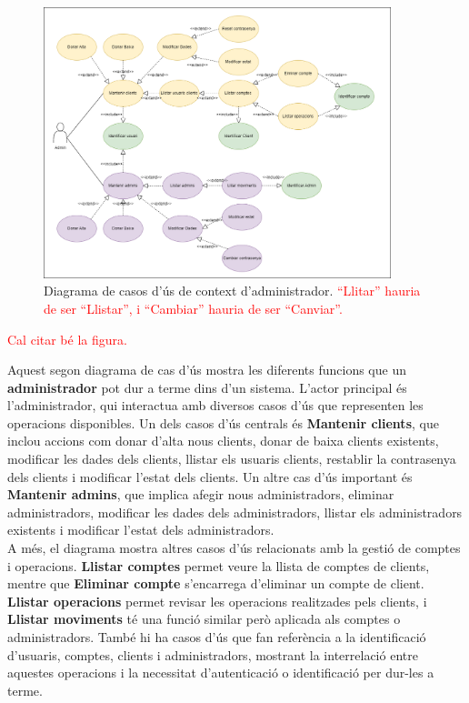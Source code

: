 \documentclass[a4paper,12pt,twoside]{ThesisStyle}
\newcommand{\pau}[1]{\textcolor{red}{#1}}
\begin{document}
\clearpage
\begin{figure}[h]
    \centering
    \includegraphics[width=0.9\textwidth]{imatges/diagrama caso de uso admin.png}
    \caption{Diagrama de casos d'ús de context d'administrador. \pau{``Llitar'' hauria de ser ``Llistar'', i ``Cambiar'' hauria de ser ``Canviar''.}}
    \label{fig:Diagrama de Casos d'Ús de Context d'Administrador}
\end{figure}

\pau{Cal citar bé la figura.}


Aquest segon diagrama de cas d'ús mostra les diferents funcions que un \textbf{administrador} pot dur a terme dins d'un sistema. L'actor principal és l'administrador, qui interactua amb diversos casos d'ús que representen les operacions disponibles. Un dels casos d'ús centrals és \textbf{Mantenir clients}, que inclou accions com donar d'alta nous clients, donar de baixa clients existents, modificar les dades dels clients, llistar els usuaris clients, restablir la contrasenya dels clients i modificar l'estat dels clients. Un altre cas d'ús important és \textbf{Mantenir admins}, que implica afegir nous administradors, eliminar administradors, modificar les dades dels administradors, llistar els administradors existents i modificar l'estat dels administradors.\\

A més, el diagrama mostra altres casos d'ús relacionats amb la gestió de comptes i operacions. \textbf{Llistar comptes} permet veure la llista de comptes de clients, mentre que \textbf{Eliminar compte} s'encarrega d'eliminar un compte de client. \textbf{Llistar operacions} permet revisar les operacions realitzades pels clients, i \textbf{Llistar moviments} té una funció similar però aplicada als comptes o administradors. També hi ha casos d'ús que fan referència a la identificació d'usuaris, comptes, clients i administradors, mostrant la interrelació entre aquestes operacions i la necessitat d'autenticació o identificació per dur-les a terme.
\end{document}
